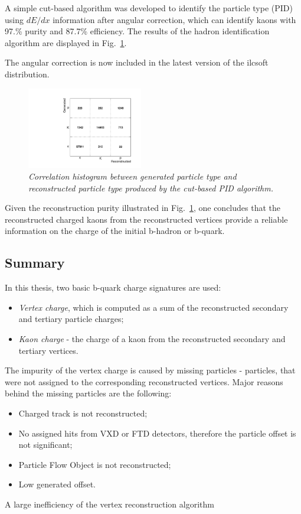 A simple cut-based algorithm was developed to identify the particle type (PID) using $dE/dx$ information after angular correction, which can identify kaons with 97.\% purity and 87.7\% efficiency.
The results of the hadron identification algorithm are displayed in Fig.~\ref{fig:dEdxResults_3}.

The angular correction is now included in the latest version of the {\sc ilcsoft} distribution.

\begin{figure}
{\centering
    \includegraphics[width=0.45\textwidth]{ILD/plots/dedx-results.pdf}
    \caption{\sl Correlation histogram between generated particle type and reconstructed particle type produced by the cut-based PID algorithm.
    }
    \label{fig:dEdxResults_3}
  }
 
\end{figure}


Given the reconstruction purity illustrated in Fig.~\ref{fig:dEdxResults_3}, one concludes that the reconstructed charged kaons from the reconstructed vertices provide a reliable information on the charge of the initial b-hadron or b-quark. 

\subsection{Summary}
In this thesis, two basic b-quark charge signatures are used: 
\begin{itemize}
	\item \textit{Vertex charge}, which is computed as a sum of the reconstructed secondary and tertiary particle charges;
	\item\textit{ Kaon charge} - the charge of a kaon from the reconstructed secondary and tertiary vertices. 
\end{itemize}
The impurity of the vertex charge is caused by missing particles - particles, that were not assigned to the corresponding reconstructed vertices. 
Major reasons behind the missing particles are the following:
\begin{itemize}
	\item Charged track is not reconstructed;
	\item No assigned hits from VXD or FTD detectors, therefore the particle offset is not significant;
	\item Particle Flow Object is not reconstructed;
	\item Low generated offset.
\end{itemize}
A large inefficiency of the vertex reconstruction algorithm 

